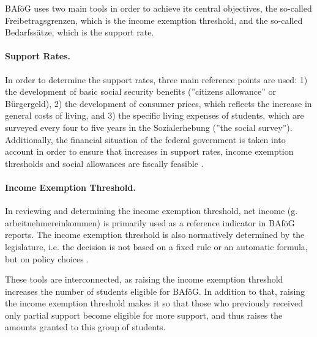 
BAföG uses two main tools in order to achieve its central objectives, the so-called Freibetragsgrenzen, which is the income exemption threshold, and the so-called Bedarfssätze, which is the support rate.

\paragraph{Support Rates.}
In order to determine the support rates, three main reference points are used: 1) the development of basic social security benefits (”citizens allowance” or Bürgergeld), 2) the development of consumer prices, which reflects the increase in general costs of living, and 3) the specific living expenses of students, which are surveyed every four to five years in the Sozialerhebung (”the social survey”). Additionally, the financial situation of the federal government is taken into account in order to ensure that increases in support rates, income exemption thresholds and social allowances are fiscally feasible \citep{meier_zur_2024}.

\paragraph{Income Exemption Threshold.}
In reviewing and determining the income exemption threshold, net income (g. arbeitnehmereinkommen) is primarily used as a reference indicator in BAföG reports. The income exemption threshold is also normatively determined by the legislature, i.e. the decision is not based on a fixed rule or an automatic formula, but on policy choices \citep{meier_zur_2024}.


These tools are interconnected, as raising the income exemption threshold increases the number of students eligible for BAföG. In addition to that, raising the income exemption threshold makes it so that those who previously received only partial support become eligible for more support, and thus raises the amounts granted to this group of students.

